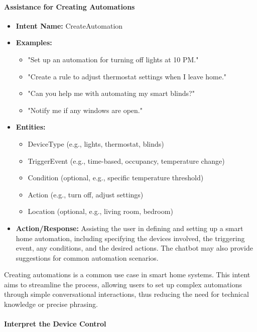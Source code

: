 \paragraph{Assistance for Creating Automations}

\begin{itemize}
    \item \textbf{Intent Name:} CreateAutomation
    \item \textbf{Examples:}
    \begin{itemize}
        \item "Set up an automation for turning off lights at 10 PM."
        \item "Create a rule to adjust thermostat settings when I leave home."
        \item "Can you help me with automating my smart blinds?"
        \item "Notify me if any windows are open."
    \end{itemize}
    \item \textbf{Entities:}
    \begin{itemize}
        \item DeviceType (e.g., lights, thermostat, blinds)
        \item TriggerEvent (e.g., time-based, occupancy, temperature change)
        \item Condition (optional, e.g., specific temperature threshold)
        \item Action (e.g., turn off, adjust settings)
        \item Location (optional, e.g., living room, bedroom)
    \end{itemize}
    \item \textbf{Action/Response:} Assisting the user in defining and setting up a smart home automation, including specifying the devices involved, the triggering event, any conditions, and the desired actions. The chatbot may also provide suggestions for common automation scenarios.
\end{itemize}

Creating automations is a common use case in smart home systems. This intent aims to streamline the process, allowing users to set up complex automations through simple conversational interactions, thus reducing the need for technical knowledge or precise phrasing.

\paragraph{Interpret the Device Control}

